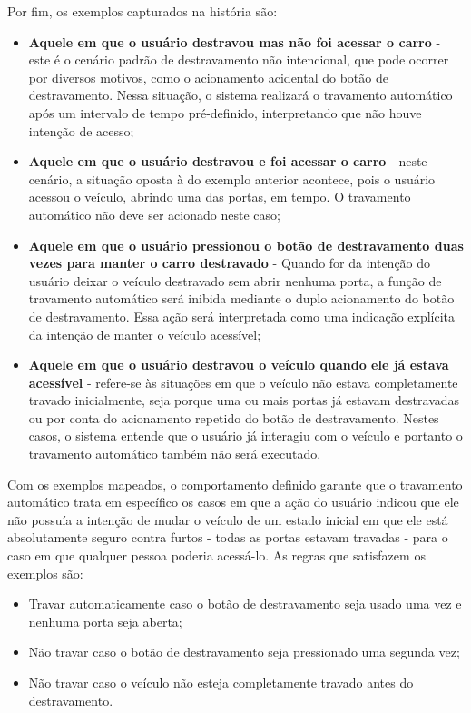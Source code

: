 Por fim, os exemplos capturados na história são:

\begin{itemize}
    \item \textbf{Aquele em que o usuário destravou mas não foi acessar o carro} - este é o cenário padrão de destravamento não intencional, que pode ocorrer por diversos motivos, como o acionamento acidental do botão de destravamento. Nessa situação, o sistema realizará o travamento automático após um intervalo de tempo pré-definido, interpretando que não houve intenção de acesso;
    \item \textbf{Aquele em que o usuário destravou e foi acessar o carro} - neste cenário, a situação oposta à do exemplo anterior acontece, pois o usuário acessou o veículo, abrindo uma das portas, em tempo. O travamento automático não deve ser acionado neste caso;
    \item \textbf{Aquele em que o usuário pressionou o botão de destravamento duas vezes para manter o carro destravado} - Quando for da intenção do usuário deixar o veículo destravado sem abrir nenhuma porta, a função de travamento automático será inibida mediante o duplo acionamento do botão de destravamento. Essa ação será interpretada como uma indicação explícita da intenção de manter o veículo acessível;
    \item \textbf{Aquele em que o usuário destravou o veículo quando ele já estava acessível} - refere-se às situações em que o veículo não estava completamente travado inicialmente, seja porque uma ou mais portas já estavam destravadas ou por conta do acionamento repetido do botão de destravamento. Nestes casos, o sistema entende que o usuário já interagiu com o veículo e portanto o travamento automático também não será executado.
\end{itemize}

Com os exemplos mapeados, o comportamento definido garante que o travamento automático trata em específico os casos em que a ação do usuário indicou que ele não possuía a intenção de mudar o veículo de um estado inicial em que ele está absolutamente seguro contra furtos - todas as portas estavam travadas - para o caso em que qualquer pessoa poderia acessá-lo. As regras que satisfazem os exemplos são:

\begin{itemize}
    \item Travar automaticamente caso o botão de destravamento seja usado uma vez e nenhuma porta seja aberta;
    \item Não travar caso o botão de destravamento seja pressionado uma segunda vez;
    \item Não travar caso o veículo não esteja completamente travado antes do destravamento.
\end{itemize}


